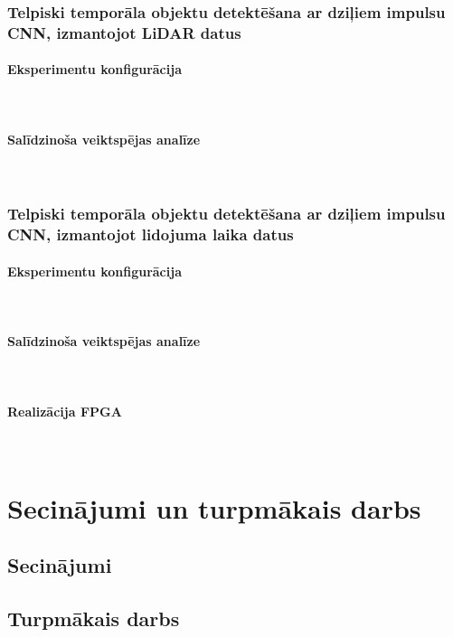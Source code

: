 \documentclass[a4paper, 12pt]{article}
\begin{document}
  \subsubsection{Telpiski temporāla objektu detektēšana ar dziļiem impulsu CNN, izmantojot LiDAR datus}
    \paragraph{Eksperimentu konfigurācija}\mbox{} \\
    
    \paragraph{Salīdzinoša veiktspējas analīze}\mbox{} \\
  
  \subsubsection{Telpiski temporāla objektu detektēšana ar dziļiem impulsu CNN, izmantojot lidojuma laika datus}
    \paragraph{Eksperimentu konfigurācija}\mbox{} \\
    
    \paragraph{Salīdzinoša veiktspējas analīze}\mbox{} \\
    
    \paragraph{Realizācija FPGA}\mbox{} \\
    



\section{Secinājumi un turpmākais darbs}
\subsection{Secinājumi}

\subsection{Turpmākais darbs}



\printbibliography[heading=bibintoc,title={LITERATŪRAS SARAKSTS}]
\end{document}
